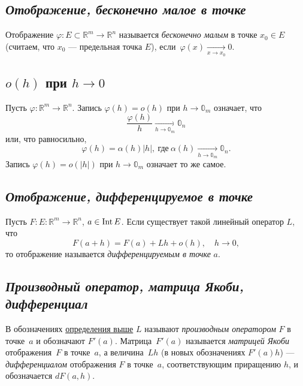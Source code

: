 \subsection{\itshape Отображение, бесконечно малое в точке}

\begin{definition}
	Отображение \(\varphi \colon E \subset \mathbb{R}^m \to \mathbb{R}^n\) называется \textit{бесконечно малым} в точке \(x_0 \in E\) (считаем, что \(x_0\) --- предельная точка \(E\)), если~\(\varphi(x) \xrightarrow[x \to x_0]{} 0\).
\end{definition}

\subsection{\(o(h)\) при \(h \to 0\)}

\begin{definition}
	Пусть \(\varphi \colon \mathbb{R}^m \to \mathbb{R}^n\). Запись \(\varphi (h) = o(h)\) при \(h \to \mathbb{0}_m\) означает, что \[
		\frac{\varphi(h)}{h} \xrightarrow[h \to \mathbb{0}_m]{} \mathbb{0}_n
	\]
	или, что равносильно, \[
		\varphi(h) = \alpha(h) |h|, \ \text{где} \ \alpha(h) \xrightarrow[h \to \mathbb{0}_m]{} \mathbb{0}_n.
	\]
	Запись \(\varphi(h) = o(|h|)\) при \(h \to \mathbb{0}_m\) означает то же самое.
\end{definition}

\subsection{\itshape Отображение, дифференцируемое в точке}
\hypertarget{d43}{}
\begin{definition}
	Пусть \(F \colon E \colon \mathbb{R}^m \to \mathbb{R}^n\), \(a \in \operatorname{Int} E\). Если существует такой линейный оператор \(L\), что \[
		F(a + h) = F(a)	+ L h + o(h), \quad h \to 0,
 	\]
	то отображение называется \textit{дифференцируемым в точке} \(a\).
\end{definition}

\subsection{\itshape Производный оператор, матрица Якоби, дифференциал}

\begin{definition}
	В обозначениях \hyperlink{d43}{определения выше} \(L\) называют \textit{производным оператором} \(F\) в точке~\(a\) и обозначают \(F'(a)\). Матрица~\(F'(a)\) называется \textit{матрицей Якоби} отображения~\(F\) в точке~\(a\), а величина~\(L h\) (в новых обозначениях \(F'(a) h\)) --- \textit{дифференциалом} отображения \(F\) в точке~\(a\), соответствующим приращению \(h\), и обозначается \(dF(a, h)\).
\end{definition}

